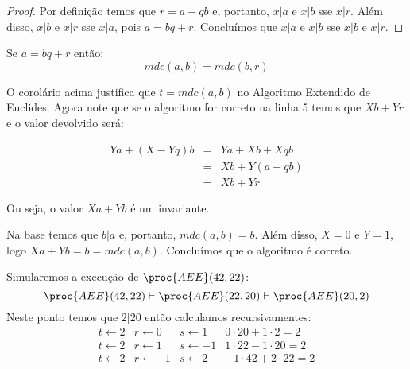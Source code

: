 \begin{proof}
  Por definição temos que $r = a - qb$ e, portanto, $x|a$ e $x|b$ sse $x|r$. 
Além disso, $x|b$ e $x|r$ sse $x|a$, pois $a = bq + r$.
Concluímos que $x|a$ e $x|b$ sse $x|b$ e $x|r$.
\end{proof}

\begin{corollary}
Se $a = bq + r$ então:
\begin{displaymath}
  mdc(a,b) = mdc(b, r)  
\end{displaymath}
\end{corollary}

O corolário acima justifica que $t = mdc(a,b)$ no Algoritmo Extendido de Euclides.
Agora note que se o algoritmo for correto na linha 5 temos que $Xb + Yr$ e o valor devolvido será:

\begin{eqnarray*}
  Ya + (X - Yq)b & = & Ya + Xb + Xqb \\
                 & = & Xb + Y(a + qb) \\
                 & = & Xb + Yr
\end{eqnarray*}

Ou seja, o valor $Xa + Yb$ é um invariante. 

Na base temos que $b|a$ e, portanto, $mdc(a,b) = b$.
Além disso, $X = 0$ e $Y = 1$, logo $Xa + Yb = b = mdc(a,b)$.
Concluímos que o algoritmo é correto.
 
\begin{example}
    Simularemos a execução de $\proc{AEE}(42, 22)$:
    \begin{displaymath}
      \proc{AEE}(42, 22) \vdash \proc{AEE}(22, 20) \vdash \proc{AEE}(20, 2)
    \end{displaymath}
    Neste ponto temos que $2|20$ então calculamos recursivamentes:
    \begin{displaymath}
      \begin{array}{lllr}
        t \gets 2 & r \gets 0 & s \gets 1 & 0 \cdot 20 + 1 \cdot 2 = 2\\
        t \gets 2 & r \gets 1 & s \gets -1 & 1 \cdot 22 - 1 \cdot 20 = 2\\
        t \gets 2 & r \gets -1 & s \gets 2 & -1 \cdot 42 + 2 \cdot 22 = 2\\
      \end{array}
    \end{displaymath}
\end{example}



